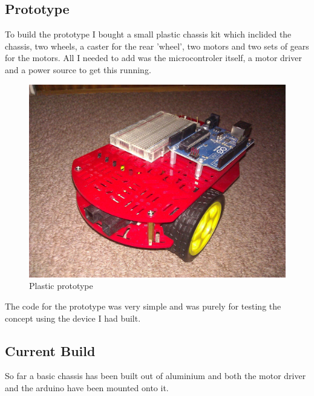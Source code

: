 \documentclass[11pt,fleqn,twoside]{article}
\begin{document}
\subsection{Prototype}
To build the prototype I bought a small plastic chassis kit which inclided the chassis, two wheels, a caster for the rear 'wheel', two motors and two sets of gears for the motors.  All I needed to add was the microcontroler itself, a motor driver and a power source to get this running.
\begin{figure}[h]
\centering
        \includegraphics[width=5.0in] {figures/tria-mkI.jpg}
        \caption{Plastic prototype}
        \label{Plastic prototype}
\end{figure}
The code for the prototype was very simple and was purely for testing the concept using the device I had built.
\begin{framed}
\begin{verbatimtab}
if(sensor_range < value)
	{
		motors.turn(random);
	}else
	{
		motors.forward(1);
	}
}
\end{verbatimtab}
\end{framed}
\subsection{Current Build}
So far a basic chassis has been built out of aluminium and both the motor driver and the arduino have been mounted onto it.
\end{document}
